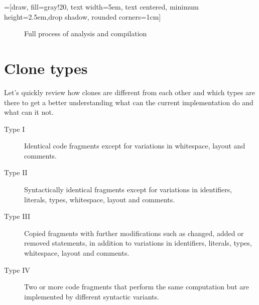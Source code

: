 \documentclass[a0,portrait]{a0poster}
\begin{document}
\begin{multicols}{2}

=[draw, fill=gray!20, text width=5em, text centered,
    minimum height=2.5em,drop shadow, rounded corners=1cm]

\def\blockdist{2.3}
\def\edgedist{2.5}

\begin{figure}[H]
\centering
{}
\caption{Full process of analysis and compilation}
\end{figure}



\section*{Clone types}

Let's quickly review how clones are different from each other and which types are there
to get a better understanding what can the current implementation do and what can it not.

\begin{description}
  \item[Type I] Identical code fragments except for variations in whitespace, layout and
  comments.
  \item[Type II] Syntactically identical fragments except for variations in identifiers,
  literals, types, whitespace, layout and comments.
  \item[Type III] Copied fragments with further modifications such as changed, added or
  removed statements, in addition to variations in identifiers, literals, types,
  whitespace, layout and comments.
  \item[Type IV] Two or more code fragments that perform the same computation but are
  implemented by different syntactic variants.
\end{description}


\end{multicols}
\end{document}
